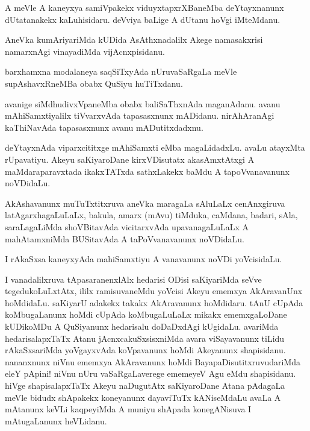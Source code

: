 \begin{mng}
A meVle A kaneyxya samiVpakekx viduyxtapxrXBaneMba deYtayxnanunx dUtatanakekx kaLuhisidaru. deVviya baLige A dUtanu hoVgi iMteMdanu.
\end{mng}

\begin{mng}
AneVka kumAriyariMda kUDida AsAthxnadalilx Akege namasakxrisi namarxnAgi vinayadiMda vijAcnxpisidanu.
\end{mng}

\begin{mng}
barxhamxna modalaneya saqSiTxyAda nUruvaSaRgaLa meVle supAshavxRneMBa obabx QuSiyu huTiTxdanu.
\end{mng}

\begin{mng}
avanige siMdhudivxVpaneMba obabx baliSaThxnAda maganAdanu. avanu mAhiSamxtiyalilx tiVvarxvAda tapasasxnunx mADidanu. nirAhAranAgi kaThiNavAda tapasasxnunx avanu mADutitxdadxnu.
\end{mng}

\begin{mng}
deYtayxnAda viparxcititxge mAhiSamxti eMba magaLidadxLu. avaLu atayxMta rUpavatiyu. Akeyu saKiyaroDane kirxVDisutatx akasAmxtAtxgi A maMdaraparavxtada ikakxTATxda sathxLakekx baMdu A tapoVvanavanunx noVDidaLu.
\end{mng}

\begin{mng}
AkAshavanunx muTuTxtitxruva aneVka maragaLa sAluLaLx cenAnxgiruva latAgarxhagaLuLaLx, bakula, amarx (mAvu) tiMduka, caMdana, badari, sAla, saraLagaLiMda shoVBitavAda vicitarxvAda upavanagaLuLaLx A mahAtamxniMda BUSitavAda A taPoVvanavanunx noVDidaLu.
\end{mng}

\begin{mng}
I rAkaSxsa kaneyxyAda mahiSamxtiyu A vanavanunx noVDi yoVcisidaLu.
\end{mng}

\begin{mng}
I vanadalilxruva tApasaranenxlAlx hedarisi ODisi saKiyariMda seVve tegedukoLuLxtAtx, ililx ramisuvaneMdu yoVcisi Akeyu ememxya AkAravanUnx hoMdidaLu. saKiyarU adakekx takakx AkAravanunx hoMdidaru. tAnU cUpAda koMbugaLanunx hoMdi cUpAda koMbugaLuLaLx mikakx ememxgaLoDane kUDikoMDu A QuSiyanunx hedarisalu doDaDxdAgi kUgidaLu. avariMda hedarisalapxTaTx Atanu jAcnxcakuSxsisxniMda avara viSayavanunx tiLidu rAkaSxsariMda yoVgayxvAda koVpavanunx hoMdi Akeyanunx shapisidanu. nananxnunx niVnu ememxya AkAravanunx hoMdi BayapaDisutitxruvudariMda eleY pApini! niVnu nUru vaSaRgaLaverege ememeyeV Agu eMdu shapisidanu. hiVge shapisalapxTaTx Akeyu naDugutAtx saKiyaroDane Atana pAdagaLa meVle bidudx shApakekx koneyanunx dayaviTuTx kANiseMdaLu avaLa A mAtanunx keVLi kaqpeyiMda A muniyu shApada konegANisuva I mAtugaLanunx heVLidanu.
\end{mng}

